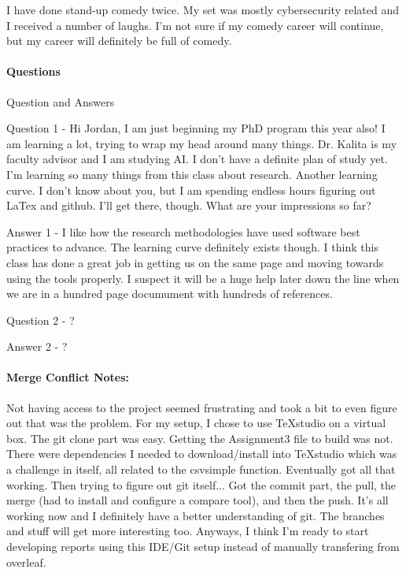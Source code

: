 	I have done stand-up comedy twice. My set was mostly cybersecurity related and I received a number of laughs. I'm not sure if my comedy career will continue, but my career will definitely be full of comedy. 
	

	
	
	
	\paragraph*{\textbf{Questions}}
	
	Question and Answers
	
	
	Question 1 - Hi Jordan, I am just beginning my PhD program this year also!  I am learning a lot, trying to wrap my head around many things.  Dr. Kalita is my faculty advisor and I am studying AI.  I don't have a definite plan of study yet.  I'm learning so many things from this class about research. Another learning curve.  I don't know about you, but I am spending endless hours figuring out LaTex and github. I'll get there, though.  What are your impressions so far?
	
	
	Answer 1 - I like how the research methodologies have used software best practices to advance. The learning curve definitely exists though. I think this class has done a great job in getting us on the same page and moving towards using the tools properly. I suspect it will be a huge help later down the line when we are in a hundred page documument with hundreds of references.

	
	Question 2 - ?
	
	
	Answer 2 - ?


	\paragraph*{\textbf{Merge Conflict Notes:}}
	
	
	Not having access to the project seemed frustrating and took a bit to even figure out that was the problem. For my setup, I chose to use TeXstudio on a virtual box. The git clone part was easy. Getting the Assignment3 file to build was not. There were dependencies I needed to download/install into TeXstudio which was a challenge in itself, all related to the csvsimple function. Eventually got all that working. Then trying to figure out git itself... Got the commit part, the pull, the merge (had to install and configure a compare tool), and then the push. It's all working now and I definitely have a better understanding of git. The branches and stuff will get more interesting too. Anyways, I think I'm ready to start developing reports using this IDE/Git setup instead of manually transfering from overleaf.
		
	
%

 
